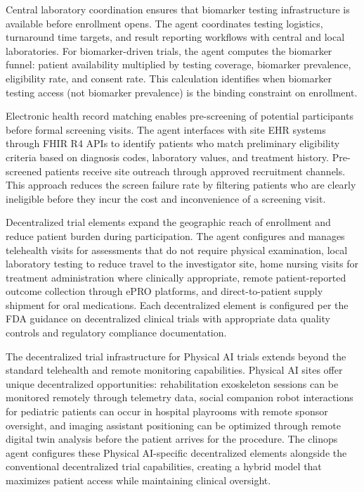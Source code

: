 Central laboratory coordination ensures that biomarker testing infrastructure is
available before enrollment opens. The agent coordinates testing logistics, turnaround
time targets, and result reporting workflows with central and local laboratories. For
biomarker-driven trials, the agent computes the biomarker funnel: patient availability
multiplied by testing coverage, biomarker prevalence, eligibility rate, and consent rate.
This calculation identifies when biomarker testing access (not biomarker prevalence) is the
binding constraint on enrollment.

Electronic health record matching enables pre-screening of potential participants before
formal screening visits. The agent interfaces with site EHR systems through FHIR R4
APIs \cite{hl7-fhir} to identify patients who match preliminary eligibility criteria
based on diagnosis codes, laboratory values, and treatment history. Pre-screened patients
receive site outreach through approved recruitment channels. This approach reduces the
screen failure rate by filtering patients who are clearly ineligible before they incur
the cost and inconvenience of a screening visit.

Decentralized trial elements expand the geographic reach of enrollment and reduce patient
burden during participation. The agent configures and manages telehealth visits for
assessments that do not require physical examination, local laboratory testing to reduce
travel to the investigator site, home nursing visits for treatment administration where
clinically appropriate, remote patient-reported outcome collection through ePRO platforms,
and direct-to-patient supply shipment for oral medications. Each decentralized element
is configured per the FDA guidance on decentralized clinical trials with appropriate
data quality controls and regulatory compliance documentation.

The decentralized trial infrastructure for Physical AI trials extends beyond the standard
telehealth and remote monitoring capabilities. Physical AI sites offer unique decentralized
opportunities: rehabilitation exoskeleton sessions can be monitored remotely through
telemetry data, social companion robot interactions for pediatric patients can occur in
hospital playrooms with remote sponsor oversight, and imaging assistant positioning can be
optimized through remote digital twin analysis before the patient arrives for the procedure.
The clinops agent configures these Physical AI-specific decentralized elements alongside the
conventional decentralized trial capabilities, creating a hybrid model that maximizes patient
access while maintaining clinical oversight.


